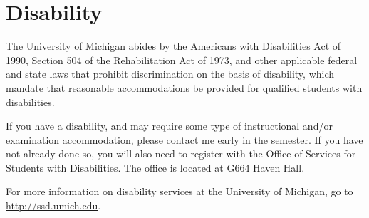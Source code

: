 \documentclass[
]{article}
\begin{document}
\hypertarget{disability}{%
\section{Disability}\label{disability}}

The University of Michigan abides by the Americans with Disabilities Act
of 1990, Section 504 of the Rehabilitation Act of 1973, and other
applicable federal and state laws that prohibit discrimination on the
basis of disability, which mandate that reasonable accommodations be
provided for qualified students with disabilities.

If you have a disability, and may require some type of instructional
and/or examination accommodation, please contact me early in the
semester. If you have not already done so, you will also need to
register with the Office of Services for Students with Disabilities. The
office is located at G664 Haven Hall.

For more information on disability services at the University of
Michigan, go to \url{http://ssd.umich.edu}.
\end{document}
